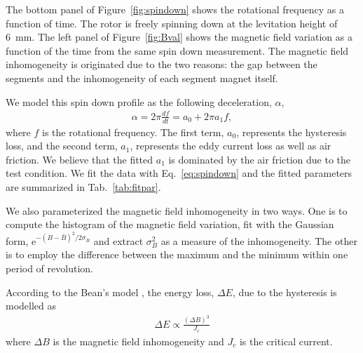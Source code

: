 \documentclass[journal]{IEEEtran}
\begin{document}
The bottom panel of Figure~\ref{fig:spindown} shows the rotational frequency as a function of time.
The rotor is freely spinning down at the levitation height of 6~mm.
The left panel of Figure~\ref{fig:Bval} shows the magnetic field variation as a function of the time from the same spin down measurement.
The magnetic field inhomogeneity is originated due to the two reasons: the gap between the segments and the inhomogeneity of each segment magnet itself.

We model this spin down profile as the following deceleration, $\alpha$,
\begin{eqnarray}
\alpha = 2\pi \frac{df}{dt} = a_0 + 2\pi a_1 f,
\label{eq:spindown}
\end{eqnarray}
where $f$ is the rotational frequency\cite{hull_review}.
The first term, $a_0$, represents the hysteresis loss, and the second term, $a_1$, represents the eddy current loss as well as air friction.
We believe that the fitted $a_1$ is dominated by the air friction due to the test condition.
We fit the data with Eq.~\ref{eq:spindown} and the fitted parameters are summarized in Tab.~\ref{tab:fitpar}.

We also parameterized the magnetic field inhomogeneity in two ways.
One is to compute the histogram of the magnetic field variation, fit with the Gaussian form, e$^{-(B-\bar{B})^2/2\sigma_B}$ and extract $\sigma_B^2$ as a measure of the inhomogeneity.
The other is to employ the difference between the maximum and the minimum within one period of revolution.

According to the Bean's model \cite{beans_model_1,beans_model_2}, the energy loss, $\Delta E$, due to the hysteresis is modelled as
\begin{eqnarray}
\Delta E \propto \frac{(\Delta B)^3}{J_c}
\label{eq:bean}
\end{eqnarray}
where $\Delta B$ is the magnetic field inhomogeneity and $J_c$ is the critical current.
\end{document}
